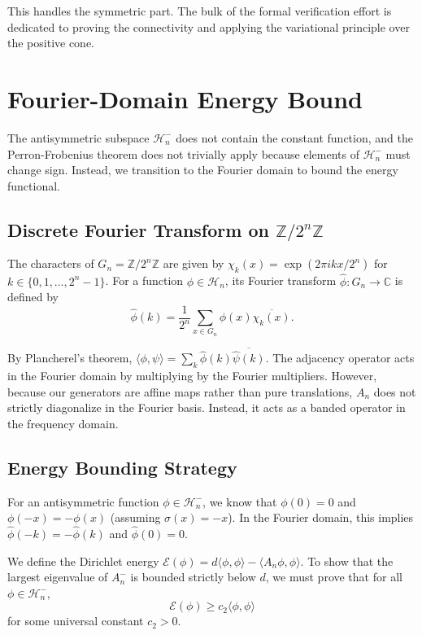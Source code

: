\documentclass[11pt, a4paper]{article}
\theoremstyle{definition}
\newcommand{\Z}{\mathbb{Z}}
\newcommand{\C}{\mathbb{C}}
\begin{document}
This handles the symmetric part. The bulk of the formal verification effort is dedicated to proving the connectivity and applying the variational principle over the positive cone.

\section{Fourier-Domain Energy Bound}

The antisymmetric subspace $\mathcal{H}_n^-$ does not contain the constant function, and the Perron-Frobenius theorem does not trivially apply because elements of $\mathcal{H}_n^-$ must change sign. Instead, we transition to the Fourier domain to bound the energy functional.

\subsection{Discrete Fourier Transform on $\Z/2^n\Z$}

The characters of $G_n = \Z/2^n\Z$ are given by $\chi_k(x) = \exp(2\pi i k x / 2^n)$ for $k \in \{0, 1, \dots, 2^n-1\}$. For a function $\phi \in \mathcal{H}_n$, its Fourier transform $\widehat{\phi} : G_n \to \C$ is defined by
\begin{equation}
    \widehat{\phi}(k) = \frac{1}{2^n} \sum_{x \in G_n} \phi(x) \overline{\chi_k(x)}.
\end{equation}

By Plancherel's theorem, $\langle \phi, \psi \rangle = \sum_{k} \widehat{\phi}(k) \overline{\widehat{\psi}(k)}$. The adjacency operator acts in the Fourier domain by multiplying by the Fourier multipliers. However, because our generators are affine maps rather than pure translations, $A_n$ does not strictly diagonalize in the Fourier basis. Instead, it acts as a banded operator in the frequency domain.

\subsection{Energy Bounding Strategy}

For an antisymmetric function $\phi \in \mathcal{H}_n^-$, we know that $\phi(0) = 0$ and $\phi(-x) = -\phi(x)$ (assuming $\sigma(x) = -x$). In the Fourier domain, this implies $\widehat{\phi}(-k) = -\widehat{\phi}(k)$ and $\widehat{\phi}(0) = 0$.

We define the Dirichlet energy $\mathcal{E}(\phi) = d \langle \phi, \phi \rangle - \langle A_n \phi, \phi \rangle$. To show that the largest eigenvalue of $A_n^-$ is bounded strictly below $d$, we must prove that for all $\phi \in \mathcal{H}_n^-$,
\begin{equation}
    \mathcal{E}(\phi) \ge c_2 \langle \phi, \phi \rangle
\end{equation}
for some universal constant $c_2 > 0$.
\end{document}
